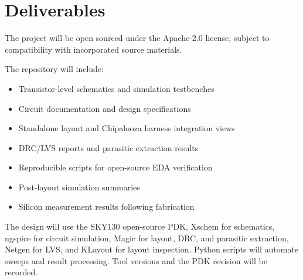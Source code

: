 
\section{Deliverables}

The project will be open sourced under the Apache-2.0 license, subject to compatibility with incorporated source materials.

The repository will include:

\begin{itemize}
    \item Transistor-level schematics and simulation testbenches

    \item Circuit documentation and design specifications

    \item Standalone layout and Chipalooza harness integration views

    \item DRC/LVS reports and parasitic extraction results

    \item Reproducible scripts for open-source EDA verification

    \item Post-layout simulation summaries

    \item Silicon measurement results following fabrication
\end{itemize}

The design will use the SKY130 open-source PDK, Xschem for schematics, ngspice for circuit simulation, Magic for layout, DRC, and parasitic extraction, Netgen for LVS, and KLayout for layout inspection.
Python scripts will automate sweeps and result processing.
Tool versions and the PDK revision will be recorded.
